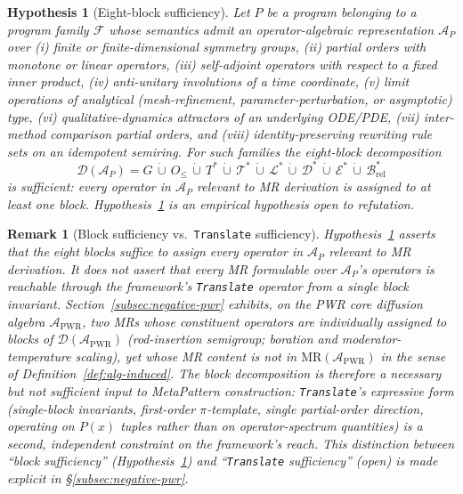 \documentclass[acmsmall, screen]{acmart}
\newtheorem{hypothesis}{Hypothesis}
\newtheorem{remark}{Remark}
\begin{document}
\begin{hypothesis}[Eight-block sufficiency]
\label{hyp:seven-blocks}
Let $P$ be a program belonging to a program family $\mathcal{F}$ whose semantics admit an operator-algebraic representation $\mathcal{A}_P$ over (i) finite or finite-dimensional symmetry groups, (ii) partial orders with monotone or linear operators, (iii) self-adjoint operators with respect to a fixed inner product, (iv) anti-unitary involutions of a time coordinate, (v) limit operations of analytical (mesh-refinement, parameter-perturbation, or asymptotic) type, (vi) qualitative-dynamics attractors of an underlying ODE/PDE, (vii) inter-method comparison partial orders, and (viii) identity-preserving rewriting rule sets on an idempotent semiring. For such families the eight-block decomposition
$$\mathcal{D}(\mathcal{A}_P) = G \,\dot\cup\, O_{\le} \,\dot\cup\, T^{*} \,\dot\cup\, \mathcal{T}^{*} \,\dot\cup\, \mathcal{L}^{*} \,\dot\cup\, \mathcal{D}^{*} \,\dot\cup\, \mathcal{E}^{*} \,\dot\cup\, \mathcal{B}^{*}_{\mathrm{rel}}$$
is sufficient: every operator in $\mathcal{A}_P$ relevant to MR derivation is assigned to at least one block. Hypothesis~\ref{hyp:seven-blocks} is an empirical hypothesis open to refutation.
\end{hypothesis}

\begin{remark}[Block sufficiency vs.\ \texttt{Translate} sufficiency]
\label{rem:block-vs-translate}
Hypothesis~\ref{hyp:seven-blocks} asserts that the eight blocks suffice to \emph{assign} every operator in $\mathcal{A}_P$ relevant to MR derivation. It does not assert that every MR formulable over $\mathcal{A}_P$'s operators is reachable through the framework's \texttt{Translate} operator from a single block invariant. Section~\ref{subsec:negative-pwr} exhibits, on the PWR core diffusion algebra $\mathcal{A}_{\mathrm{PWR}}$, two MRs whose constituent operators are individually assigned to blocks of $\mathcal{D}(\mathcal{A}_{\mathrm{PWR}})$ (rod-insertion semigroup; boration and moderator-temperature scaling), yet whose MR content is not in $\mathrm{MR}(\mathcal{A}_{\mathrm{PWR}})$ in the sense of Definition~\ref{def:alg-induced}. The block decomposition is therefore a necessary but not sufficient input to MetaPattern construction: \texttt{Translate}'s expressive form (single-block invariants, first-order $\pi$-template, single partial-order direction, operating on $P(x)$ tuples rather than on operator-spectrum quantities) is a second, independent constraint on the framework's reach. This distinction between ``block sufficiency'' (Hypothesis~\ref{hyp:seven-blocks}) and ``\texttt{Translate} sufficiency'' (open) is made explicit in \S\ref{subsec:negative-pwr}.
\end{remark}
\end{document}
